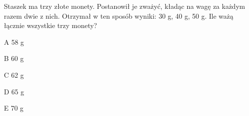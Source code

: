 \begin{tresc}
Staszek ma trzy złote monety. Postanowił je zważyć, kładąc na wagę za każdym razem dwie z nich. Otrzymał w ten sposób wyniki: 30 g, 40 g, 50 g. Ile ważą łącznie wszystkie trzy monety?
\end{tresc}
\begin{wariant}{A} 58 g \end{wariant}
\begin{wariant}{B} 60 g \end{wariant}
\begin{wariant}{C} 62 g \end{wariant}
\begin{wariant}{D} 65 g \end{wariant}
\begin{wariant}{E} 70 g \end{wariant}
